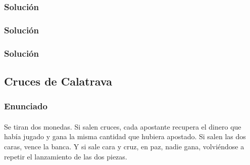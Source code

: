   \begin{frame}
   \frametitle{Solución}


  \end{frame}

  \begin{frame}
   \frametitle{Solución}

   \begin{testfail}
    
   \end{testfail}

  \end{frame}

  \begin{frame}
   \frametitle{Solución}

   \begin{codepass}
    
   \end{codepass}

  \end{frame}


  \subsection{Cruces de Calatrava}

  \begin{frame}
   \frametitle{Enunciado}
   \framesubtitle{}

   Se tiran dos monedas. Si salen cruces, cada apostante recupera el
   dinero que había jugado y gana la misma cantidad que hubiera
   apostado.  Si salen las dos caras, vence la banca.  Y si sale cara y
   cruz, en paz, nadie gana, volviéndose a repetir el lanzamiento de las
   dos piezas.


  \end{frame}
